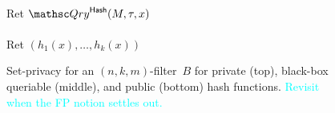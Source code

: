 \begin{figure}
{{\medskip
{}\\
Ret $\Qry^{\HashOracle}(M,\tau,x)$\\

\medskip
{}\\
Ret $\left(h_1(x),\ldots,h_k(x)\right)$\\
}
}
\caption{Set-privacy for an $(n,k,m)$-filter~$B$ for private (top), black-box queriable (middle),  and public (bottom) hash functions. \textcolor{cyan}{Revisit when the FP notion settles out.}}
\label{fig:fp-filter}
\end{figure}


\fi